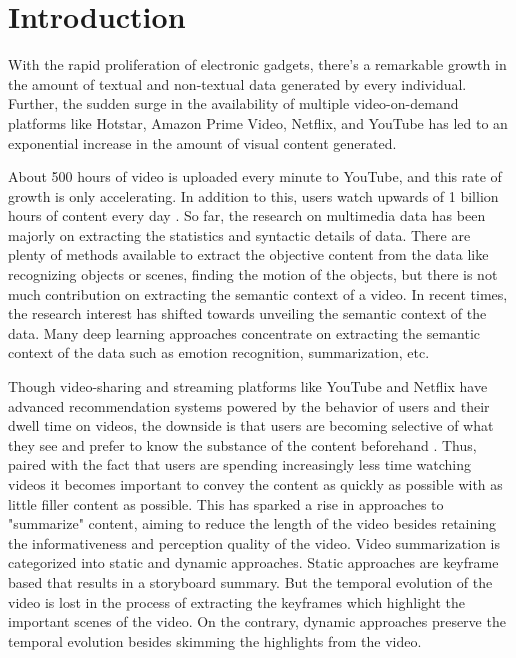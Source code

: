 
\chapter{Introduction} 
\label{Chapter1} 

    With the rapid proliferation of electronic gadgets, there's a remarkable growth in the amount of textual and non-textual data generated by every individual. Further, the sudden surge in the availability of multiple video-on-demand platforms like Hotstar, Amazon Prime Video, Netflix, and YouTube has led to an exponential increase in the amount of visual content generated. 
    
    About 500 hours of video is uploaded every minute to YouTube, and this rate of growth is only accelerating. In addition to this, users watch upwards of 1 billion hours of content every day \cite{Youtube_2019}. So far, the research on multimedia data has been majorly on extracting the statistics and syntactic details of data. There are plenty of methods available to extract the objective content from the data like recognizing objects or scenes, finding the motion of the objects, but there is not much contribution on extracting the semantic context of a video. In recent times, the research interest has shifted towards unveiling the semantic context of the data. Many deep learning approaches concentrate on extracting the semantic context of the data such as emotion recognition, summarization, etc. 
	
	Though video-sharing and streaming platforms like YouTube and Netflix\cite{netflix} have advanced recommendation systems powered by the behavior of users and their dwell time on videos, the downside is that users are becoming selective of what they see and prefer to know the substance of the content beforehand \cite{youtube}. Thus, paired with the fact that users are spending increasingly less time watching videos it becomes important to convey the content as quickly as possible with as little filler content as possible. This has sparked a rise in approaches to "summarize" content, aiming to reduce the length of the video besides retaining the informativeness and perception quality of the video. Video summarization is categorized into static and dynamic approaches. Static approaches are keyframe based that results in a storyboard summary. But the temporal evolution of the video is lost in the process of extracting the keyframes which highlight the important scenes of the video. On the contrary, dynamic approaches preserve the temporal evolution besides skimming the highlights from the video. 
	
